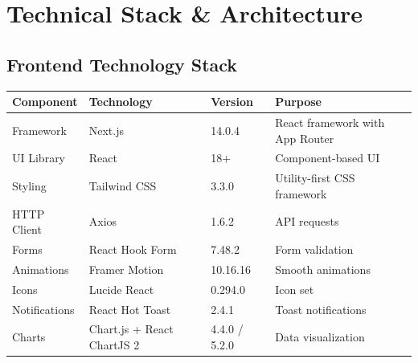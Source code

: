 \documentclass{article}
\begin{document}
\section{Technical Stack \& Architecture}

\subsection{Frontend Technology Stack}
\begin{longtable}{|l|l|l|l|}
\hline
\textbf{Component} & \textbf{Technology} & \textbf{Version} & \textbf{Purpose} \\
\hline
Framework & Next.js & 14.0.4 & React framework with App Router \\
UI Library & React & 18+ & Component-based UI \\
Styling & Tailwind CSS & 3.3.0 & Utility-first CSS framework \\
HTTP Client & Axios & 1.6.2 & API requests \\
Forms & React Hook Form & 7.48.2 & Form validation \\
Animations & Framer Motion & 10.16.16 & Smooth animations \\
Icons & Lucide React & 0.294.0 & Icon set \\
Notifications & React Hot Toast & 2.4.1 & Toast notifications \\
Charts & Chart.js + React ChartJS 2 & 4.4.0 / 5.2.0 & Data visualization \\
\hline
\end{longtable}
\end{document}
